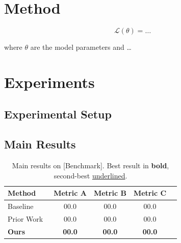 \documentclass[12pt, a4paper]{article}
\begin{document}
\section{Method}
\label{sec:method}


\begin{equation}
  \mathcal{L}(\theta) = \ldots
  \label{eq:loss}
\end{equation}

where $\theta$ are the model parameters and \ldots

\section{Experiments}
\label{sec:experiments}

\subsection{Experimental Setup}


\subsection{Main Results}


\begin{table}[h]
  \centering
  \caption{Main results on [Benchmark]. Best result in \textbf{bold}, second-best \underline{underlined}.}
  \label{tab:main}
  \begin{tabular}{lcccc}
    \toprule
    \textbf{Method} & \textbf{Metric A} & \textbf{Metric B} & \textbf{Metric C} \\
    \midrule
    Baseline        & 00.0 & 00.0 & 00.0 \\
    Prior Work~\cite{ref} & 00.0 & 00.0 & 00.0 \\
    \textbf{Ours}   & \textbf{00.0} & \textbf{00.0} & \textbf{00.0} \\
    \bottomrule
  \end{tabular}
\end{table}
\end{document}
